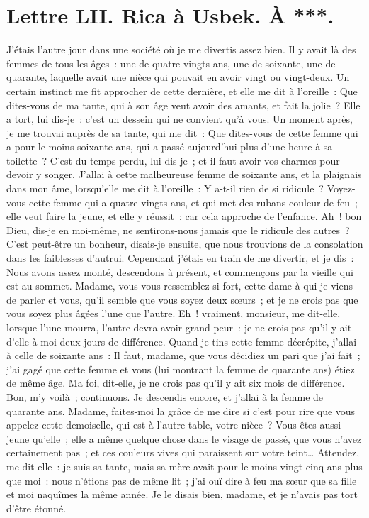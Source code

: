\documentclass[french,twoside]{book} %
\newcommand{\dateline}[1]{\medskip{\RaggedLeft{#1}\par}\bigskip}
\begin{document}
\dateline{De Moscou, le 2 de la lune de Chalval, 1713.}
\section[{Lettre LII. Rica à Usbek. À ***.}]{Lettre LII. Rica à Usbek. À ***.}\renewcommand{\leftmark}{Lettre LII. Rica à Usbek. À ***.}

\noindent J’étais l’autre jour dans une société où je me divertis assez bien. Il y avait là des femmes de tous les âges : une de quatre-vingts ans, une de soixante, une de quarante, laquelle avait une nièce qui pouvait en avoir vingt ou vingt-deux. Un certain instinct me fit approcher de cette dernière, et elle me dit à l’oreille : Que dites-vous de ma tante, qui à son âge veut avoir des amants, et fait la jolie ? Elle a tort, lui dis-je : c’est un dessein qui ne convient qu’à vous. Un moment après, je me trouvai auprès de sa tante, qui me dit : Que dites-vous de cette femme qui a pour le moins soixante ans, qui a passé aujourd’hui plus d’une heure à sa toilette ? C’est du temps perdu, lui dis-je ; et il faut avoir vos charmes pour devoir y songer. J’allai à cette malheureuse femme de soixante ans, et la plaignais dans mon âme, lorsqu’elle me dit à l’oreille : Y a-t-il rien de si ridicule ? Voyez-vous cette femme qui a quatre-vingts ans, et qui met des rubans couleur de feu ; elle veut faire la jeune, et elle y réussit : car cela approche de l’enfance. Ah ! bon Dieu, dis-je en moi-même, ne sentirons-nous jamais que le ridicule des autres ? C’est peut-être un bonheur, disais-je ensuite, que nous trouvions de la consolation dans les faiblesses d’autrui. Cependant j’étais en train de me divertir, et je dis : Nous avons assez monté, descendons à présent, et commençons par la vieille qui est au sommet. Madame, vous vous ressemblez si fort, cette dame à qui je viens de parler et vous, qu’il semble que vous soyez deux sœurs ; et je ne crois pas que vous soyez plus âgées l’une que l’autre. Eh ! vraiment, monsieur, me dit-elle, lorsque l’une mourra, l’autre devra avoir grand-peur : je ne crois pas qu’il y ait d’elle à moi deux jours de différence. Quand je tins cette femme décrépite, j’allai à celle de soixante ans : Il faut, madame, que vous décidiez un pari que j’ai fait ; j’ai gagé que cette femme et vous (lui montrant la femme de quarante ans) étiez de même âge. Ma foi, dit-elle, je ne crois pas qu’il y ait six mois de différence. Bon, m’y voilà ; continuons. Je descendis encore, et j’allai à la femme de quarante ans. Madame, faites-moi la grâce de me dire si c’est pour rire que vous appelez cette demoiselle, qui est à l’autre table, votre nièce ? Vous êtes aussi jeune qu’elle ; elle a même quelque chose dans le visage de passé, que vous n’avez certainement pas ; et ces couleurs vives qui paraissent sur votre teint… Attendez, me dit-elle : je suis sa tante, mais sa mère avait pour le moins vingt-cinq ans plus que moi : nous n’étions pas de même lit ; j’ai ouï dire à feu ma sœur que sa fille et moi naquîmes la même année. Je le disais bien, madame, et je n’avais pas tort d’être étonné.\par
\end{document}
